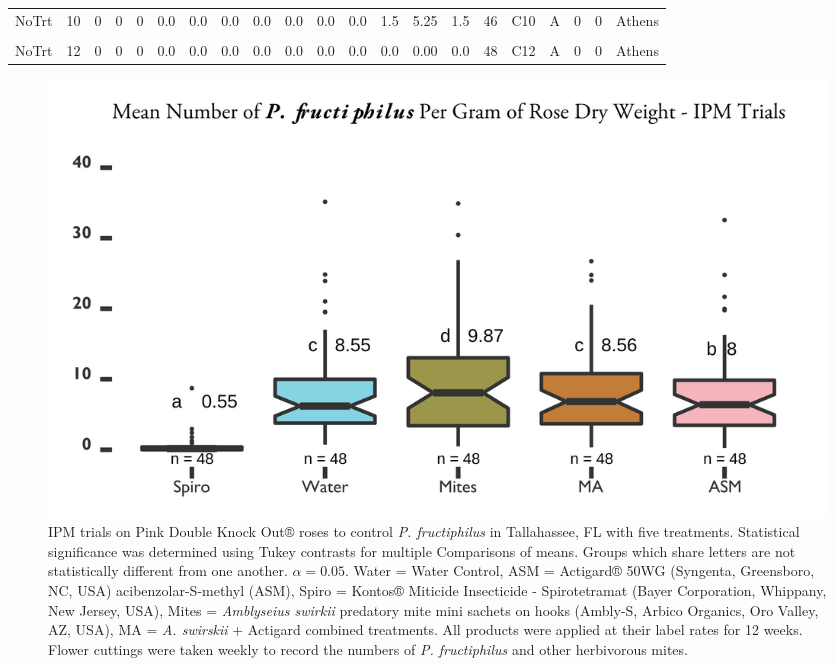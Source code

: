 \documentclass[12pt,final,CPage]{ufthesis}
\begin{document}
{\begin{landscape}
\begin{table}
{\begin{tabular}[t]{lrrrrrrrrrrrrrrrllrrl}
  \addlinespace
  NoTrt & 10 & 0 & 0 & 0 & 0.0 & 0.0 & 0.0 & 0.0 & 0.0 & 0.0 & 0.0 & 1.5 & 5.25 & 1.5 & 46 & C10 & A & 0 & 0 & Athens\\
  \cellcolor{gray!6}{NoTrt} & \cellcolor{gray!6}{11} & \cellcolor{gray!6}{0} & \cellcolor{gray!6}{0} & \cellcolor{gray!6}{0} & \cellcolor{gray!6}{0.0} & \cellcolor{gray!6}{0.0} & \cellcolor{gray!6}{0.0} & \cellcolor{gray!6}{0.0} & \cellcolor{gray!6}{0.0} & \cellcolor{gray!6}{0.0} & \cellcolor{gray!6}{0.0} & \cellcolor{gray!6}{0.0} & \cellcolor{gray!6}{0.00} & \cellcolor{gray!6}{0.0} & \cellcolor{gray!6}{47} & \cellcolor{gray!6}{C11} & \cellcolor{gray!6}{A} & \cellcolor{gray!6}{0} & \cellcolor{gray!6}{0} & \cellcolor{gray!6}{Athens}\\
  NoTrt & 12 & 0 & 0 & 0 & 0.0 & 0.0 & 0.0 & 0.0 & 0.0 & 0.0 & 0.0 & 0.0 & 0.00 & 0.0 & 48 & C12 & A & 0 & 0 & Athens\\
  \bottomrule
  \end{tabular}}
  \end{table}
  \end{landscape}
  \begin{figure}

  {\centering \includegraphics[width=0.8\linewidth]{figure/rrv_ipm_graph_erios_talla} 

  }

  \caption[IPM trials on Pink Double Knock Out® roses to control \textit{P. fructiphilus} in Tallahassee, FL with five treatments]{IPM trials on Pink Double Knock Out® roses to control \textit{P. fructiphilus} in Tallahassee, FL with five treatments. Statistical significance was determined using Tukey contrasts for multiple Comparisons of means. Groups which share letters are not statistically different from one another. $\alpha = 0.05$. Water = Water Control, ASM = Actigard® 50WG (Syngenta, Greensboro, NC, USA) acibenzolar-S-methyl (ASM), Spiro = Kontos® Miticide Insecticide - Spirotetramat (Bayer Corporation, Whippany, New Jersey, USA), Mites = \textit{Amblyseius swirkii} predatory mite mini sachets on hooks (Ambly-S, Arbico Organics, Oro Valley, AZ, USA), MA = \textit{A. swirskii} + Actigard combined treatments. All products were applied at their label rates for 12 weeks. Flower cuttings were taken weekly to record the numbers of \textit{P. fructiphilus} and other herbivorous mites.}\label{fig:ipm-talla-erios}
  \end{figure}
  \begin{figure}


\end{figure}}
\end{document}

